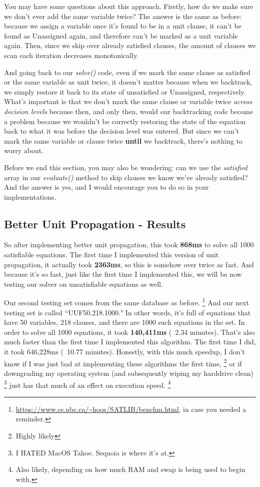 You may have some questions about this approach. Firstly, how do we make sure we don't 
ever add the same variable twice? The answer is the same as before: because we assign a 
variable once it's found to be in a unit clause, it can't be found as Unassigned again, 
and therefore can't be marked as a unit variable again. Then, since we skip over already 
satisfied clauses, the amount of clauses we scan each iteration decreases monotonically. 

And going back to our \textit{solve()} code, even if we mark the same clause as satisfied 
or the same variable as unit twice, it doesn't matter because when we backtrack, we simply 
restore it back to its state of unsatisfied or Unassigned, respectively. What's important is 
that we don't mark the same clause or variable twice \textit{across decision levels} because 
then, and only then, would our backtracking code become a problem because we wouldn't be 
correctly restoring the state of the equation back to what it was before the decision level 
was entered. But since we can't mark the same variable or clause twice \textbf{until}
we backtrack, there's nothing to worry about.

Before we end this section, you may also be wondering: can we use the \textit{satisfied}
array in our \textit{evaluate()} method to skip clauses we know we've already satisfied?
And the answer is yes, and I would encourage you to do so in your implementations.

\subsection{Better Unit Propagation - Results}
So after implementing better unit propagation, this took \textbf{868ms} to solve all 1000 
satisfiable equations. The first time I implemented this version of unit propagation,
it actually took \textbf{2363ms}, so this is somehow over twice as fast. And because it's so 
fast, just like the first time I implemented this, we will be now testing our solver on 
unsatisfiable equations as well.

Our second testing set comes from the same database as before.
\footnote{\url{https://www.cs.ubc.ca/~hoos/SATLIB/benchm.html}, in case you needed a reminder.}
And our next testing set is called ``UUF50.218.1000." In other words, it's full of equations that 
have 50 variables, 218 clauses, and there are 1000 such equations in the set. In order to solve 
all 1000 equations, it took \textbf{140,411ms} (~2.34 minutes). That's also much faster than the first time 
I implemented this algorithm. The first time I did, it took 646,228ms (~10.77 minutes). Honestly,
with this much speedup, I don't know if I was just bad at implementing these algorithms the first time,
\footnote{Highly likely}
or if downgrading my operating system (and subsequently wiping my harddrive clean)
\footnote{I HATED MacOS Tahoe. Sequoia is where it's at.}
just has that much of an effect on execution speed.
\footnote{Also likely, depending on how much RAM and swap is being used to begin with.}

